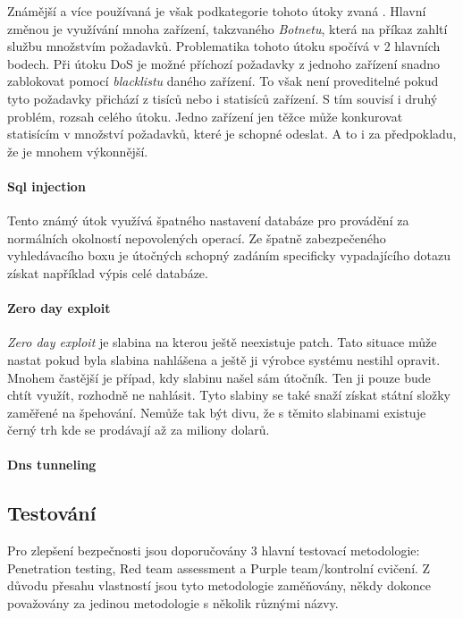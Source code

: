 Známější a více používaná je však podkategorie tohoto útoky zvaná .
Hlavní změnou je využívání mnoha zařízení, takzvaného \textit{Botnetu}, která na příkaz zahltí službu množstvím požadavků.
Problematika tohoto útoku spočívá v 2 hlavních bodech.
Při útoku \ac{DoS} je možné příchozí požadavky z jednoho zařízení snadno zablokovat pomocí \textit{blacklistu} daného zařízení.
To však není proveditelné pokud tyto požadavky přichází z tisíců nebo i statisíců zařízení.
S tím souvisí i druhý problém, rozsah celého útoku.
Jedno zařízení jen těžce může konkurovat statisícím v množství požadavků, které je schopné odeslat.
A to i za předpokladu, že je mnohem výkonnější.

\paragraph{Sql injection}
Tento známý útok využívá špatného nastavení databáze pro provádění za normálních okolností nepovolených operací.
Ze špatně zabezpečeného vyhledávacího boxu je útočných schopný zadáním specificky vypadajícího dotazu získat například výpis celé databáze.

\paragraph{Zero day exploit}
\textit{Zero day exploit} je slabina na kterou ještě neexistuje patch.
Tato situace může nastat pokud byla slabina nahlášena a ještě ji výrobce systému nestihl opravit.
Mnohem častější je případ, kdy slabinu našel sám útočník.
Ten ji pouze bude chtít využít, rozhodně ne nahlásit.
Tyto slabiny se také snaží získat státní složky zaměřené na špehování.
Nemůže tak být divu, že s těmito slabinami existuje černý trh\cite{world_end_2021} kde se prodávají až za miliony dolarů.

\paragraph{Dns tunneling}





\subsection{Testování}
Pro zlepšení bezpečnosti jsou doporučovány 3 hlavní testovací metodologie: Penetration testing, Red team assessment a Purple team/kontrolní cvičení.
Z důvodu přesahu vlastností jsou tyto metodologie zaměňovány, někdy dokonce považovány za jedinou metodologie s několik různými názvy.\cite{securityInteligence_pen_test_red_team_purple_team}

